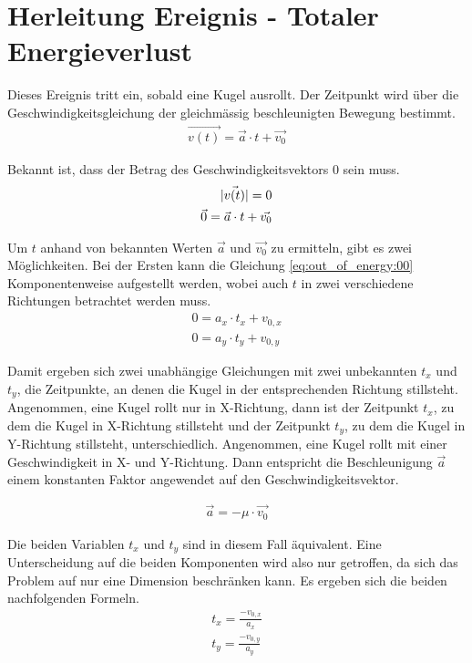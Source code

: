\section{Herleitung Ereignis - Totaler Energieverlust}\label{anhang:herleitung:event:outOfEnergy}

Dieses Ereignis tritt ein, sobald eine Kugel ausrollt. Der Zeitpunkt wird über die Geschwindigkeitsgleichung der
gleichmässig beschleunigten Bewegung bestimmt.
\begin{align}
    \vec{v(t)} = \vec{a} \cdot t + \vec{v_0}
\end{align}

Bekannt ist, dass der Betrag des Geschwindigkeitsvektors $0$ sein muss.
\begin{align}
    \lvert \vec{v(t)} \rvert = 0\\
    \vec{0} = \vec{a} \cdot t + \vec{v_0}\label{eq:out_of_energy:00}
\end{align}

Um $t$ anhand von bekannten Werten $\vec{a}$ und $\vec{v_0}$ zu ermitteln, gibt es zwei Möglichkeiten. Bei der Ersten
kann die Gleichung \ref{eq:out_of_energy:00} Komponentenweise aufgestellt werden, wobei auch $t$ in zwei verschiedene
Richtungen betrachtet werden muss.
\begin{align}
    0 = a_x \cdot t_x + v_{0,x}\\
    0 = a_y \cdot t_y + v_{0,y}
\end{align}

Damit ergeben sich zwei unabhängige Gleichungen mit zwei unbekannten $t_x$ und $t_y$, die Zeitpunkte, an denen die Kugel in der
entsprechenden Richtung stillsteht.
Angenommen, eine Kugel rollt nur in X-Richtung, dann ist der Zeitpunkt $t_x$, zu dem die Kugel in X-Richtung stillsteht
und der Zeitpunkt $t_y$, zu dem die Kugel in Y-Richtung stillsteht, unterschiedlich.
Angenommen, eine Kugel rollt mit einer Geschwindigkeit in X- und Y-Richtung. Dann entspricht die Beschleunigung $\vec{a}$
einem konstanten Faktor angewendet auf den Geschwindigkeitsvektor.

\begin{align}
    \vec{a} = -\mu \cdot \vec{v_0}
\end{align}

Die beiden Variablen $t_x$ und $t_y$ sind in diesem Fall äquivalent. Eine Unterscheidung auf die beiden Komponenten wird
also nur getroffen, da sich das Problem auf nur eine Dimension beschränken kann. Es ergeben sich die beiden nachfolgenden
Formeln.
\begin{align}
    t_x = \frac{-v_{0,x}}{a_x}\\
    t_y = \frac{-v_{0,y}}{a_y}
\end{align}

